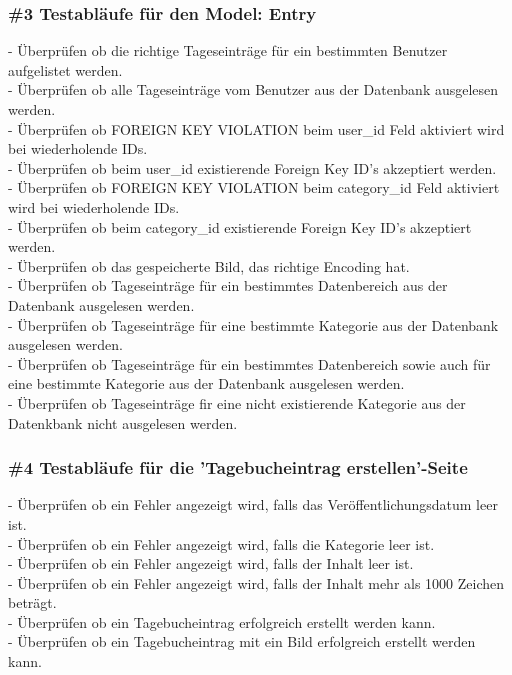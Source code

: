 \subsubsection*{\#3 Testabläufe für den Model: Entry}
- Überprüfen ob die richtige Tageseinträge für ein bestimmten Benutzer aufgelistet werden.\\
- Überprüfen ob alle Tageseinträge vom Benutzer aus der Datenbank ausgelesen werden.\\
- Überprüfen ob FOREIGN KEY VIOLATION beim user\_id Feld aktiviert wird bei wiederholende IDs.\\
- Überprüfen ob beim user\_id existierende Foreign Key ID's akzeptiert werden.\\
- Überprüfen ob FOREIGN KEY VIOLATION beim category\_id Feld aktiviert wird bei wiederholende IDs.\\
- Überprüfen ob beim category\_id existierende Foreign Key ID's akzeptiert werden.\\
- Überprüfen ob das gespeicherte Bild, das richtige Encoding hat.\\
- Überprüfen ob Tageseinträge für ein bestimmtes Datenbereich aus der Datenbank ausgelesen werden.\\
- Überprüfen ob Tageseinträge für eine bestimmte Kategorie aus der Datenbank ausgelesen werden.\\
- Überprüfen ob Tageseinträge für ein bestimmtes Datenbereich sowie auch für eine bestimmte Kategorie aus der Datenbank ausgelesen werden.\\
- Überprüfen ob Tageseinträge fir eine nicht existierende Kategorie aus der Datenkbank nicht ausgelesen werden.

\subsubsection*{\#4 Testabläufe für die 'Tagebucheintrag erstellen'-Seite}
- Überprüfen ob ein Fehler angezeigt wird, falls das Veröffentlichungsdatum leer ist.\\
- Überprüfen ob ein Fehler angezeigt wird, falls die Kategorie leer ist.\\
- Überprüfen ob ein Fehler angezeigt wird, falls der Inhalt leer ist.\\
- Überprüfen ob ein Fehler angezeigt wird, falls der Inhalt mehr als 1000 Zeichen beträgt.\\
- Überprüfen ob ein Tagebucheintrag erfolgreich erstellt werden kann.\\
- Überprüfen ob ein Tagebucheintrag mit ein Bild erfolgreich erstellt werden kann.

